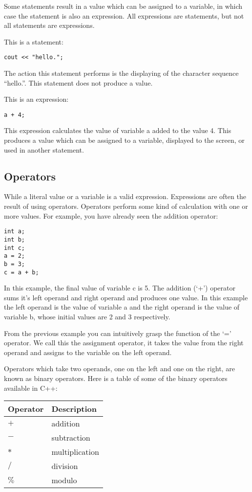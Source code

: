 \documentclass[a4paper,12pt]{article}
\begin{document}
Some statements result in a value which can be assigned to a variable, in which case the statement is also an expression. All expressions are statements, but not all statements are expressions. 

This is a statement: 

\begin{lstlisting}
cout << "hello.";
\end{lstlisting}

The action this statement performs is the displaying of the character sequence ``hello.''. This statement does not produce a value.

This is an expression:

\begin{lstlisting}
a + 4;
\end{lstlisting}

This expression calculates the value of variable a added to the value 4. This produces a value which can be assigned to a variable, displayed to the screen, or used in another statement. 

\subsection*{Operators}

While a literal value or a variable is a valid expression. Expressions are often the result of using operators. Operators perform some kind of calculation with one or more values. For example, you have already seen the addition operator:
\begin{lstlisting}
int a;
int b;
int c;
a = 2;
b = 3;
c = a + b;
\end{lstlisting}
In this example, the final value of variable c is 5. The addition (`+') operator sums it's left operand and right operand and produces one value. In this example the left operand is the value of variable a and the right operand is the value of variable b, whose initial values are 2 and 3 respectively.

From the previous example you can intuitively grasp the function of the `=' operator. We call this the assignment operator, it takes the value from the right operand and assigns to the variable on the left operand.

Operators which take two operands, one on the left and one on the right, are known as binary operators. Here is a table of some of the binary operators available in C++:

\begin{tabular}{|l|l|}
\hline
Operator & Description \\
\hline
$+$ & addition \\
\hline
$-$ & subtraction \\
\hline
$*$ & multiplication \\
\hline
$/$ & division \\
\hline
$\%$ & modulo \\
\hline
\end{tabular} \\
\end{document}
